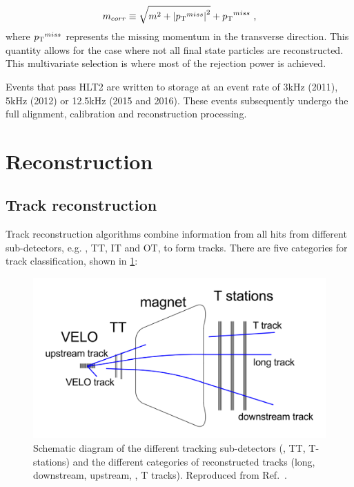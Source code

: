 \begin{equation}
m_{corr} \equiv \sqrt{m^2 + {| \mbox{$p_{\mathrm{ T}}$}^{miss} |}^2} + \mbox{$p_{\mathrm{ T}}$}^{miss} \text{ ,}
\end{equation}
where $\mbox{$p_{\mathrm{ T}}$}^{miss}$ represents the missing momentum in the transverse direction. This quantity allows for the case where not all final state particles are reconstructed. This multivariate selection is where most of the rejection power is achieved.

Events that pass HLT2 are written to storage at an event rate of 3kHz (2011), 5kHz (2012) or 12.5kHz (2015 and 2016). These events subsequently undergo the full alignment, calibration and reconstruction processing.

\section{Reconstruction}

\subsection{Track reconstruction}
\label{sec:detector:tracks}

Track reconstruction algorithms combine information from all hits from different sub-detectors, e.g. \velo, TT, IT and OT, to form tracks. There are five categories for track classification, shown in \fig\ref{tracktypes}:

\begin{figure}[h]
\includegraphics[width=\linewidth]{figures/detector/tracktypes.pdf}
\caption{Schematic diagram of the different tracking sub-detectors (\velo, TT, T-stations) and the different categories of reconstructed tracks (long, downstream, upstream, \velo, T tracks). Reproduced from Ref.~\cite{LHCb-DP-2013-002}.}
\label{tracktypes}
\end{figure}

